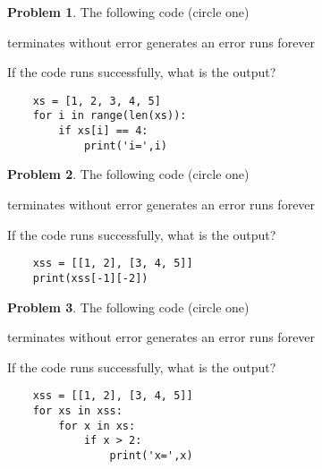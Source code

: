 \documentclass[10pt]{article}
\theoremstyle{definition}
\newtheorem{problem}{Problem}
\begin{document}
\begin{problem}
    The following code (circle one)

    \vspace{0.25in}
    \hspace{0.5in}terminates without error 
    \hspace{1in}generates an error
    \hspace{1in}runs forever
    \vspace{0.25in}

    \noindent
    If the code runs successfully, what is the output?
\end{problem}
\begin{lstlisting}
    xs = [1, 2, 3, 4, 5]
    for i in range(len(xs)):
        if xs[i] == 4:
            print('i=',i)
\end{lstlisting}
\vspace{1.5in}

\newpage
\begin{problem}
    The following code (circle one)

    \vspace{0.25in}
    \hspace{0.5in}terminates without error 
    \hspace{1in}generates an error
    \hspace{1in}runs forever
    \vspace{0.25in}

    \noindent
    If the code runs successfully, what is the output?
\end{problem}
\begin{lstlisting}
    xss = [[1, 2], [3, 4, 5]]
    print(xss[-1][-2])
\end{lstlisting}
\vspace{1.5in}

\begin{problem}
    The following code (circle one)

    \vspace{0.25in}
    \hspace{0.5in}terminates without error 
    \hspace{1in}generates an error
    \hspace{1in}runs forever
    \vspace{0.25in}

    \noindent
    If the code runs successfully, what is the output?
\end{problem}
\begin{lstlisting}
    xss = [[1, 2], [3, 4, 5]]
    for xs in xss:
        for x in xs:
            if x > 2:
                print('x=',x)
\end{lstlisting}
\vspace{1.5in}
\end{document}
